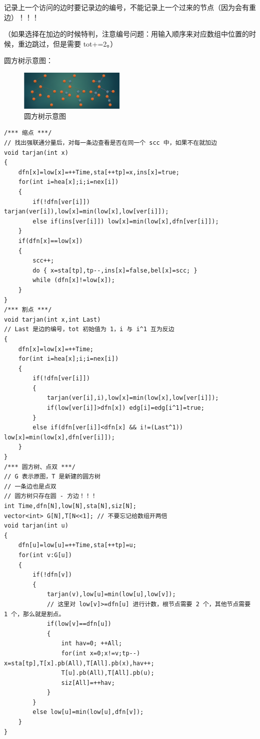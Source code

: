 记录上一个访问的边时要记录边的编号，不能记录上一个过来的节点（因为会有重边）！！！

（如果选择在加边的时候特判，注意编号问题：用输入顺序来对应数组中位置的时候，重边跳过，但是需要 tot+=2。）

圆方树示意图：

\begin{figure}[H]
    \centering
    \includegraphics[width=0.45\textwidth]{src/graph/tarjan-tree.png}
    \caption{圆方树示意图}
\end{figure}

\begin{verbatim}
/*** 缩点 ***/
// 找出强联通分量后，对每一条边查看是否在同一个 scc 中，如果不在就加边
void tarjan(int x)
{
	dfn[x]=low[x]=++Time,sta[++tp]=x,ins[x]=true;
	for(int i=hea[x];i;i=nex[i])
	{
		if(!dfn[ver[i]]) tarjan(ver[i]),low[x]=min(low[x],low[ver[i]]);
		else if(ins[ver[i]]) low[x]=min(low[x],dfn[ver[i]]);
	}
	if(dfn[x]==low[x])
	{
        scc++;
		do { x=sta[tp],tp--,ins[x]=false,bel[x]=scc; }
        while (dfn[x]!=low[x]);
	}
}
/*** 割点 ***/
void tarjan(int x,int Last)
// Last 是边的编号，tot 初始值为 1，i 与 i^1 互为反边
{
    dfn[x]=low[x]=++Time;
    for(int i=hea[x];i;i=nex[i])
    {
        if(!dfn[ver[i]])
        {
            tarjan(ver[i],i),low[x]=min(low[x],low[ver[i]]);
            if(low[ver[i]]>dfn[x]) edg[i]=edg[i^1]=true;
        }
        else if(dfn[ver[i]]<dfn[x] && i!=(Last^1)) low[x]=min(low[x],dfn[ver[i]]);
    }
}
/*** 圆方树、点双 ***/
// G 表示原图，T 是新建的圆方树
// 一条边也是点双
// 圆方树只存在圆 - 方边！！！
int Time,dfn[N],low[N],sta[N],siz[N];
vector<int> G[N],T[N<<1]; // 不要忘记给数组开两倍
void tarjan(int u)
{
    dfn[u]=low[u]=++Time,sta[++tp]=u;
    for(int v:G[u])
    {
        if(!dfn[v])
        {
            tarjan(v),low[u]=min(low[u],low[v]);
            // 这里对 low[v]>=dfn[u] 进行计数，根节点需要 2 个，其他节点需要 1 个，那么就是割点。
            if(low[v]==dfn[u])
            {
                int hav=0; ++All;
                for(int x=0;x!=v;tp--) x=sta[tp],T[x].pb(All),T[All].pb(x),hav++;
                T[u].pb(All),T[All].pb(u);
                siz[All]=++hav;
            }
        }
        else low[u]=min(low[u],dfn[v]);
    }
}
\end{verbatim}